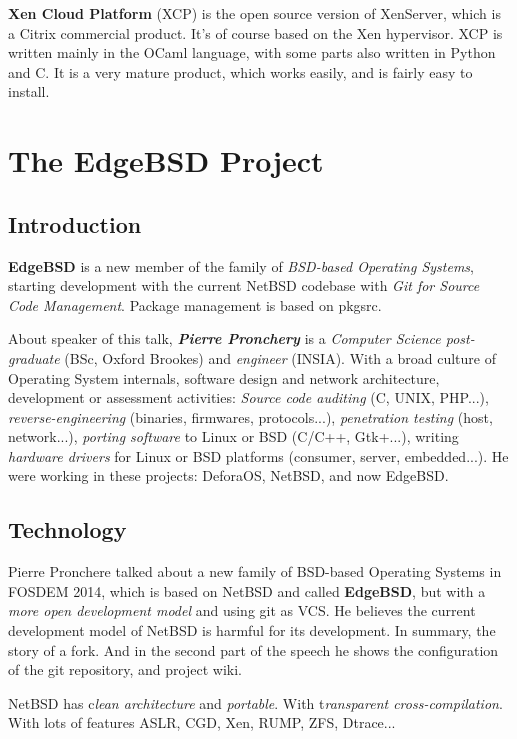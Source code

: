 \documentclass[11pt]{article}
\begin{document}
\textbf{Xen Cloud Platform }(XCP) is the open source version of XenServer, which is a Citrix commercial product. It's of course based on the Xen hypervisor. XCP is written mainly in the OCaml language, with some parts also written in Python and C. It is a very mature product, which works easily, and is fairly easy to install. 

\newpage

\section{The EdgeBSD Project}

\subsection{Introduction}
\textbf{EdgeBSD} is a new member of the family of \emph{BSD-based Operating Systems}, starting development with the current NetBSD codebase with \emph{Git for Source Code Management}. Package management is based on pkgsrc.

About speaker of this talk, \emph{\textbf{Pierre Pronchery}} is a \emph{Computer Science post-graduate} (BSc, Oxford Brookes) and \emph{engineer} (INSIA). With a broad culture of Operating System internals, software design and network architecture, development or assessment activities: \emph{Source code auditing }(C, UNIX, PHP...), \emph{reverse-engineering} (binaries, firmwares, protocols...), \emph{penetration testing} (host, network...), \emph{porting software} to Linux or BSD (C/C++, Gtk+...), writing \emph{hardware drivers} for Linux or BSD platforms (consumer, server, embedded...). He were working in these projects: DeforaOS, NetBSD, and now EdgeBSD.
\subsection{Technology}

Pierre Pronchere talked about a new family of BSD-based Operating Systems in FOSDEM 2014, which is based on NetBSD and called \textbf{EdgeBSD}, but with a \emph{more open development model} and using git as VCS. He believes the current development model of NetBSD is harmful for its development. In summary, the story of a fork. And in the second part of the speech he shows the configuration of the git repository, and project wiki.

NetBSD has c\emph{lean architecture} and \emph{portable}. With t\emph{ransparent cross-compilation}. With lots of features ASLR, CGD, Xen, RUMP, ZFS, Dtrace...
\end{document}
